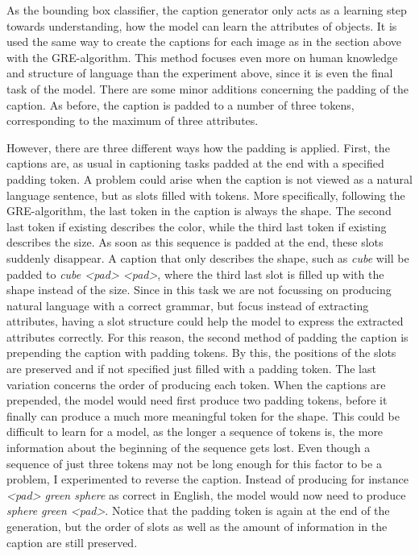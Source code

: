 As the bounding box classifier, the caption generator only acts as a learning step towards understanding, how the model can learn the attributes of objects.
It is used the same way to create the captions for each image as in the section above with the GRE-algorithm.
This method focuses even more on human knowledge and structure of language than the experiment above, since it is even the final task of the model.
There are some minor additions concerning the padding of the caption.
As before, the caption is padded to a number of three tokens, corresponding to the maximum of three attributes.

However, there are three different ways how the padding is applied.
First, the captions are, as usual in captioning tasks padded at the end with a specified padding token.
A problem could arise when the caption is not viewed as a natural language sentence, but as slots filled with tokens.
More specifically, following the GRE-algorithm, the last token in the caption is always the shape.
The second last token if existing describes the color, while the third last token if existing describes the size.
As soon as this sequence is padded at the end, these slots suddenly disappear.
A caption that only describes the shape, such as \emph{cube} will be padded to \emph{cube <pad> <pad>}, where the third last slot is filled up with the shape instead of the size.
Since in this task we are not focussing on producing natural language with a correct grammar, but focus instead of extracting attributes, having a slot structure could help the model to express the extracted attributes correctly.
For this reason, the second method of padding the caption is prepending the caption with padding tokens.
By this, the positions of the slots are preserved and if not specified just filled with a padding token.
The last variation concerns the order of producing each token.
When the captions are prepended, the model would need first produce two padding tokens, before it finally can produce a much more meaningful token for the shape.
This could be difficult to learn for a model, as the longer a sequence of tokens is, the more information about the beginning of the sequence gets lost.
Even though a sequence of just three tokens may not be long enough for this factor to be a problem, I experimented to reverse the caption.
Instead of producing for instance \emph{<pad> green sphere} as correct in English, the model would now need to produce \emph{sphere green <pad>}.
Notice that the padding token is again at the end of the generation, but the order of slots as well as the amount of information in the caption are still preserved.

